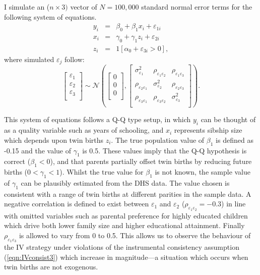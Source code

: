 \documentclass{article}[11pt,subeqn]
\begin{document}
\begin{spacing}{1.5}
I simulate an ($n \times 3)$ vector of $N=100,000$ standard normal error terms for the following system of equations.
\begin{eqnarray}
\label{eqn:MC1}
y_i&=&\beta_0+\beta_1 x_i + \varepsilon_{1i} \nonumber\\
x_i&=&\gamma_0 + \gamma_1 z_i + \varepsilon_{2i} \nonumber\\
z_i&=&1[\alpha_0+\varepsilon_{3i}>0], \nonumber
\end{eqnarray} 
where simulated $\varepsilon_j$ follow:
\begin{equation}
\begin{bmatrix}
\varepsilon_1\\
\varepsilon_2\\
\varepsilon_3\\
\end{bmatrix}
\sim \mathcal{N}
\left(\begin{bmatrix}
0\\
0\\
0\\
\end{bmatrix}
,
\begin{bmatrix}
\sigma_{\varepsilon_1}^2 &  \rho_{\varepsilon_1\varepsilon_2} &  \rho_{\varepsilon_1\varepsilon_3}\\
\rho_{\varepsilon_2\varepsilon_1} & \sigma_{\varepsilon_2}^2 &  \rho_{\varepsilon_2\varepsilon_3} \\
\rho_{\varepsilon_3\varepsilon_1}&  \rho_{\varepsilon_3\varepsilon_2}& \sigma_{\varepsilon_3}^2 \\
\end{bmatrix}\right).
\end{equation}

This system of equations follows a Q-Q type setup, in which $y_i$ can be thought of as a quality variable such as years of schooling, and $x_i$ represents
sibship size which depends upon twin births $z_i$. The true population value of $\beta_1$ is defined as -0.15 and the value of $\gamma_1$ is 0.5.  These
values imply that the Q-Q hypothesis is correct ($\beta_1<0$), and that parents partially offset twin births by reducing future births ($0<\gamma_1<1$).
Whilst the true value for $\beta_1$ is not known, the sample value of $\gamma_1$ can be plausibly estimated from the DHS data.  The  value chosen is consistent
with a range of twin births at different parities in the sample data.
A negative correlation is defined to exist between $\varepsilon_1$ and $\varepsilon_2$ ($\rho_{\varepsilon_1\varepsilon_2}=-0.3$) in line with omitted variables such as
parental preference for highly educated children which drive both lower family size and higher educational attainment. %
Finally $\rho_{\varepsilon_1\varepsilon_3}$ is allowed to vary from 0 to 0.5.  This allows
us to observe the behaviour of the IV strategy under violations of the instrumental consistency assumption (\ref{eqn:IVconsist3}) which increase in magnitude---a situation
which occurs when twin births are not exogenous.


\end{spacing}
\end{document}
